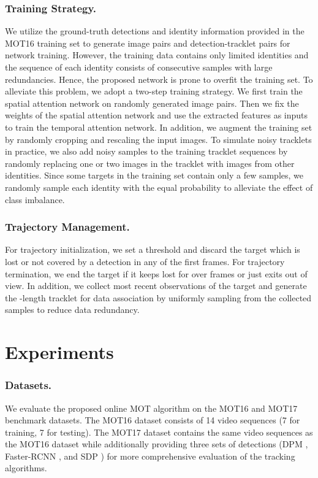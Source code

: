 \documentclass[runningheads]{llncs}
\begin{document}
  \subsubsection{Training Strategy.}
  We utilize the ground-truth detections and identity information provided in the MOT16 training set to generate image pairs and detection-tracklet pairs for network training. However, the training data contains only limited identities and the sequence of each identity consists of consecutive samples with large redundancies. Hence, the proposed network is prone to overfit the training set. To alleviate this problem, we adopt a two-step training strategy. We first train the spatial attention network on randomly generated image pairs. Then we fix the weights of the spatial attention network and use the extracted features as inputs to train the temporal attention network. 
In addition, we augment the training set by randomly cropping and rescaling the input images.
To simulate noisy tracklets in practice, we also add noisy samples to the training tracklet sequences by randomly replacing one or two images in the tracklet with images from other identities. 
Since some targets in the training set contain only a few samples, we randomly sample each identity with the equal probability to alleviate the effect of class imbalance. 
  
  \subsubsection{Trajectory Management.}
  For trajectory initialization, we set a threshold  and discard the target which is lost or not covered by a detection in any of the first  frames. For trajectory termination, we end the target if it keeps lost for over  frames or just exits out of view. In addition, we collect  most recent observations of the target and generate the -length tracklet for data association by uniformly sampling from the collected samples to reduce data redundancy.
  
\section{Experiments}
  
  \subsubsection{Datasets.}
  We evaluate the proposed online MOT algorithm on the MOT16 \cite{MOT16} and MOT17 benchmark datasets. The MOT16 dataset consists of 14 video sequences (7 for training, 7 for testing). The MOT17 dataset contains the same video sequences as the MOT16 dataset while additionally providing three sets of detections (DPM \cite{DPM}, Faster-RCNN \cite{faster-rcnn}, and SDP \cite{SDP}) for more comprehensive evaluation of the tracking algorithms.
  
\end{document}
